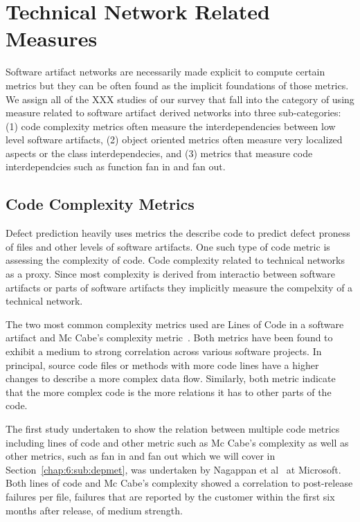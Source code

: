 \section{Technical Network Related Measures}
\label{chap:6:measure}
Software artifact networks are necessarily made explicit to compute certain metrics but they can be often found as the implicit foundations of those metrics.
We assign all of the XXX studies of our survey that fall into the category of using measure related to software artifact derived networks into three sub-categories:
(1) code complexity metrics often measure the interdependencies between low level software artifacts,
(2) object oriented metrics often measure very localized aspects or the class interdependecies,
and (3) metrics that measure code interdependcies such as function fan in and fan out.

\subsection{Code Complexity Metrics}
Defect prediction heavily uses metrics the describe code to predict defect proness of files and other levels of software artifacts.
One such type of code metric is assessing the complexity of code.
Code complexity related to technical networks as a proxy.
Since most complexity is derived from interactio between software artifacts or parts of software artifacts they implicitly measure the compelxity of a technical network.

The two most common complexity metrics used are Lines of Code in a software artifact and Mc Cabe's complexity metric~\cite{mccabe:ieee:1976}.
Both metrics have been found to exhibit a medium to strong correlation across various software projects.
In principal, source code files or methods with more code lines have a higher changes to describe a more complex data flow.
Similarly, both metric indicate that the more complex code is the more relations it has to other parts of the code.

The first study undertaken to show the relation between multiple code metrics including lines of code and other metric such as Mc Cabe's complexity as well as other metrics, such as fan in and fan out which we will cover in Section~\ref{chap:6:sub:depmet}, was undertaken by Nagappan et al~\cite{nagappan:icse:2006} at Microsoft.
Both lines of code and Mc Cabe's complexity showed a correlation to post-release failures per file, failures that are reported by the customer within the first six months after release, of medium strength.

